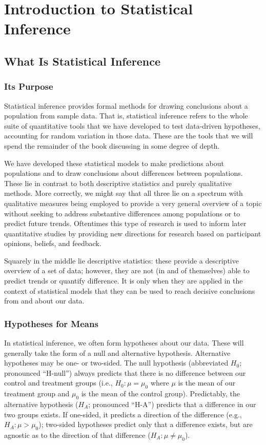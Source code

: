 
\chapter{Introduction to Statistical Inference}

\section{What Is Statistical Inference}

\subsection{Its Purpose}
Statistical inference provides formal methods for drawing conclusions about a population from sample data. That is, statistical inference refers to the whole suite of quantitative tools that we have developed to test data-driven hypotheses, accounting for random variation in those data. These are the tools that we will spend the remainder of the book discussing in some degree of depth.

We have developed these statistical models to make predictions about populations and to draw conclusions about differences between populations. These lie in contrast to both descriptive statistics and purely qualitative methods. More correctly, we might say that all three lie on a spectrum with qualitative measures being employed to provide a very general overview of a topic without seeking to address substantive differences among populations or to predict future trends. Oftentimes this type of research is used to inform later quantitative studies by providing new directions for research based on participant opinions, beliefs, and feedback.

Squarely in the middle lie descriptive statistics: these provide a descriptive overview of a set of data; however, they are not (in and of themselves) able to predict trends or quantify difference. It is only when they are applied in the context of statistical models that they can be used to reach decisive conclusions from and about our data.

\subsection{Hypotheses for Means}
In statistical inference, we often form hypotheses about our data. These will generally take the form of a null and alternative hypothesis. Alternative hypotheses may be one- or two-sided. The null hypothesis (abbreviated $H_0$; pronounced ``H-null'') always predicts that there is no difference between our control and treatment groups (i.e., $H_0: \mu=\mu_0$ where $\mu$ is the mean of our treatment group and $\mu_0$ is the mean of the control group). Predictably, the alternative hypothesis ($H_A$; pronounced ``H-A'') predicts that a difference in our two groups exists. If one-sided, it predicts a direction of the difference (e.g., $H_A: \mu > \mu_0$); two-sided hypotheses predict only that a difference exists, but are agnostic as to the direction of that difference ($H_A: \mu \neq \mu_0$).

